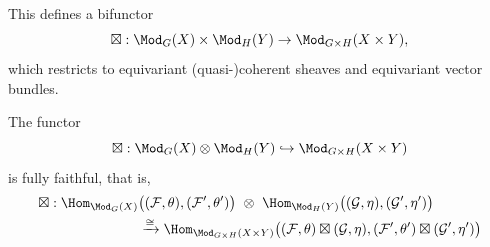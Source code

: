 \begin{defn}


This defines a bifunctor
$$
\boxtimes:
\Mod_G(X)\times\Mod_H(Y)
\rightarrow
\Mod_{G\times H}(X\times Y),
$$
which restricts to equivariant (quasi-)coherent sheaves and
equivariant vector bundles.
\end{defn}



\begin{prop}\label{prop:BoxTensorFunctorFullyFaithful}
The functor
$$
\boxtimes:
\Mod_G(X)\otimes\Mod_H(Y)
\hookrightarrow
\Mod_{G\times H}(X\times Y)
$$
is fully faithful,
that is,
\begin{align*}
\boxtimes:
\Hom_{\Mod_G(X)}&
\big(
(\mathcal{F},\theta),
(\mathcal{F}',\theta')
\big)
\
\otimes
\
\Hom_{\Mod_H(Y)}
\big(
(\mathcal{G},\eta),
(\mathcal{G}',\eta')
\big)
\\ 
&\xrightarrow{\cong}
\Hom_{\Mod_{G\times H}(X\times Y)}
\big(
(\mathcal{F},\theta)\boxtimes(\mathcal{G},\eta),
(\mathcal{F}',\theta')\boxtimes(\mathcal{G}',\eta')
\big)
\end{align*}
\end{prop}





